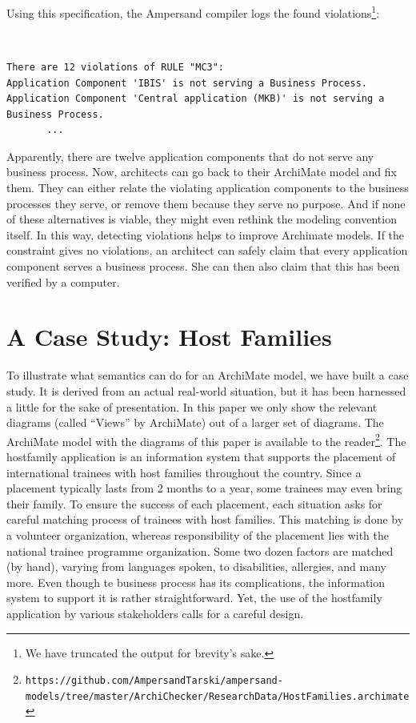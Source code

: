 \documentclass[sn-vancouver]{sn-jnl}%
\theoremstyle{thmstyleone}%
\theoremstyle{thmstyletwo}%
\theoremstyle{thmstylethree}%
\begin{document}
Using this specification, the Ampersand compiler logs the found violations\footnote{We have truncated the output for brevity's sake.}:
{\tt\small
\begin{lstlisting}[frame=single, label={log}, caption={}]
There are 12 violations of RULE "MC3":
Application Component 'IBIS' is not serving a Business Process.
Application Component 'Central application (MKB)' is not serving a Business Process.
       ...
\end{lstlisting}
}
Apparently, there are twelve application components that do not serve any business process.
Now, architects can go back to their ArchiMate model and fix them.
They can either relate the violating application components to the business processes they serve, or remove them because they serve no purpose.
And if none of these alternatives is viable, they might even rethink the modeling convention itself.
In this way, detecting violations helps to improve Archimate models.
If the constraint gives no violations, an architect can safely claim that every application component serves a business process.
She can then also claim that this has been verified by a computer.

\section{A Case Study: Host Families}\label{host families}
To illustrate what semantics can do for an ArchiMate model, we have built a case study.
It is derived from an actual real-world situation, but it has been harnessed a little for the sake of presentation.
In this paper we only show the relevant diagrams (called ``Views'' by ArchiMate) out of a larger set of diagrams.
The ArchiMate model with the diagrams of this paper is available to the reader\footnote{\tt\tiny https://github.com/AmpersandTarski/ampersand-models/tree/master/ArchiChecker/ResearchData/HostFamilies.archimate}.
The hostfamily application is an information system that supports the placement of international trainees with host families throughout the country.
Since a placement typically lasts from 2 months to a year, some trainees may even bring their family.
To ensure the success of each placement, each situation asks for careful matching process of trainees with host families.
This matching is done by a volunteer organization, whereas responsibility of the placement lies with the national trainee programme organization.
Some two dozen factors are matched (by hand), varying from languages spoken, to disabilities, allergies, and many more.
Even though te business process has its complications, the information system to support it is rather straightforward.
Yet, the use of the hostfamily application by various stakeholders calls for a careful design.
\end{document}
